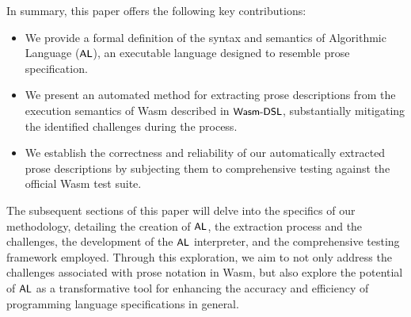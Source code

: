 In summary, this paper offers the following key contributions:

\begin{itemize}
\item We provide a formal definition of the syntax and semantics of
Algorithmic Language ($\textsf{\small AL}$), an executable language designed to resemble prose
specification.
\item We present an automated method for extracting prose descriptions from
the execution semantics of Wasm described in $\textsf{\small Wasm-DSL}$, substantially mitigating
the identified challenges during the process.
\item We establish the correctness and reliability of our automatically
extracted prose descriptions by subjecting them to comprehensive testing
against the official Wasm test suite.
\end{itemize}

The subsequent sections of this paper will delve into the specifics of our
methodology, detailing the creation of $\textsf{\small AL}$, the extraction process and the
challenges, the development of the $\textsf{\small AL}$ interpreter, and the comprehensive
testing framework employed. Through this exploration, we aim to not only
address the challenges associated with prose notation in Wasm, but also explore
the potential of $\textsf{\small AL}$ as a transformative tool for enhancing the accuracy and
efficiency of programming language specifications in general.
